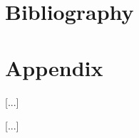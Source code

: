 \documentclass[a4paper]{article}
\begin{document}








\pagebreak

\section{Bibliography}
 


\section{Appendix}

[...]


[...]
\end{document}
